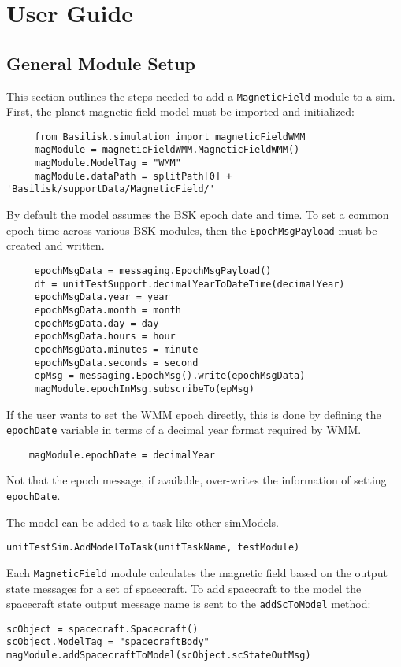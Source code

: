 
\section{User Guide}

\subsection{General Module Setup}
This section outlines the steps needed to add a {\tt MagneticField} module to a sim.
First, the planet magnetic field model must be imported and initialized:
\begin{verbatim}
     from Basilisk.simulation import magneticFieldWMM
     magModule = magneticFieldWMM.MagneticFieldWMM()
     magModule.ModelTag = "WMM"
     magModule.dataPath = splitPath[0] + 'Basilisk/supportData/MagneticField/'
\end{verbatim}
By default the model assumes the BSK epoch date and time.  To set a common epoch time across various BSK modules, then the {\tt EpochMsgPayload} must be created and written.
\begin{verbatim}
     epochMsgData = messaging.EpochMsgPayload()
     dt = unitTestSupport.decimalYearToDateTime(decimalYear)
     epochMsgData.year = year
     epochMsgData.month = month
     epochMsgData.day = day
     epochMsgData.hours = hour
     epochMsgData.minutes = minute
     epochMsgData.seconds = second
     epMsg = messaging.EpochMsg().write(epochMsgData)
     magModule.epochInMsg.subscribeTo(epMsg)
\end{verbatim}
If the user wants to set the WMM epoch directly, this is done by defining the {\tt epochDate} variable in terms of a decimal year format required by WMM. 
\begin{verbatim}
	magModule.epochDate = decimalYear
\end{verbatim}
Not that the epoch message, if available, over-writes the information of setting {\tt epochDate}.  

The model can  be added to a task like other simModels. 
\begin{verbatim}
unitTestSim.AddModelToTask(unitTaskName, testModule)
\end{verbatim}

Each {\tt MagneticField} module calculates the magnetic field based on the output state messages for a set of spacecraft.
To add spacecraft to the model the spacecraft state output message name is sent to the \verb|addScToModel| method:
\begin{verbatim}
scObject = spacecraft.Spacecraft()
scObject.ModelTag = "spacecraftBody"
magModule.addSpacecraftToModel(scObject.scStateOutMsg)
\end{verbatim}

